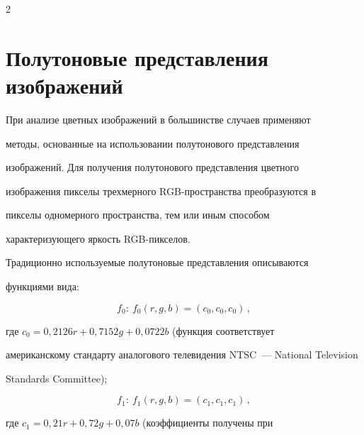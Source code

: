 








\thispagestyle{headings}



\begin{multicols}{2}



\label{st\stat}



\section{Полутоновые представления изображений}



  При анализе цветных изображений в большинстве случаев применяют

методы, основанные на использо\-вании полутонового представления

изоб\-ра\-же\-ний. Для получения полутонового представления цветного

изображения пикселы трехмерного RGB-про\-стран\-ст\-ва преобразуются в

пикселы одномерного пространства, тем или иным способом

характеризующего яркость RGB-пик\-се\-лов.



  Традиционно используемые полутоновые представления описываются

функциями вида:

  $$

  f_0:\ f_0(r, g, b) = (c_0, c_0, c_0)\,,

  $$

  где $c_0 = 0{,}2126r + 0{,}7152g + 0{,}0722b$ (функция соответствует

американскому стандарту аналогового телевидения NTSC~--- National Television

Standards Committee);

  $$

  f_1:\ f_1(r, g, b) = (c_1, c_1, c_1)\,,

  $$

   где $c_1 = 0{,}21r + 0{,}72g + 0{,}07b$ (коэффициенты получены при


\end{multicols}
